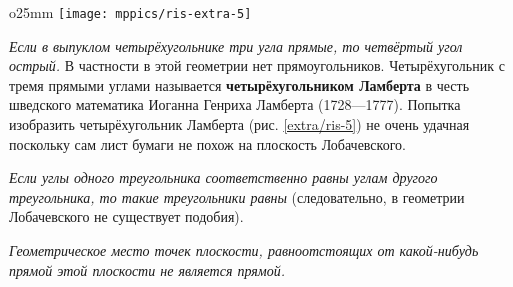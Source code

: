 \begin{wrapfigure}{o}{25mm}
\centering
\texttt{[image: mppics/ris-extra-5]}
\caption{}\label{extra/ris-5}
\end{wrapfigure}

\emph{Если в выпуклом четырёхугольнике три угла прямые, то четвёртый угол острый.}
В частности в этой геометрии нет прямоугольников.
Четырёхугольник с тремя прямыми углами называется \textbf{четырёхугольником Ламберта} в честь шведского математика Иоганна Генриха Ламберта (1728—1777).
Попытка изобразить четырёхугольник Ламберта (рис. \ref{extra/ris-5}) не очень удачная поскольку сам лист бумаги не похож на плоскость Лобачевского. %


\emph{Если углы одного треугольника соответственно равны углам другого треугольника, то такие треугольники равны} (следовательно, в геометрии Лобачевского не существует подобия).

\emph{Геометрическое место точек плоскости, равноотстоящих от какой-нибудь прямой этой плоскости не является прямой.}
